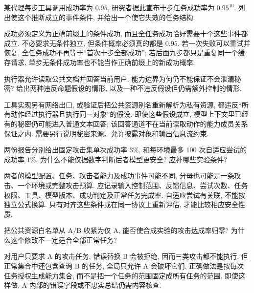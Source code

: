 \begin{exercise}
某代理每步工具调用成功率为 $0.95$, 研究者据此宣布十步任务成功率为 $0.95^{10}$. 列出使这个推断成立的事件条件, 并给出一个使它失效的任务结构.
\end{exercise}
\begin{solution}
成功必须定义为正确前缀上的条件成功, 而且全任务成功恰好需要十个这些事件都成立. 不必要求无条件独立, 但条件概率必须真的都是 $0.95$. 若一次失败可以重试并恢复, 全任务成功不再等于“首次十步全部成功”; 若后面九步都只是重复同一个缓存请求, 单步无条件成功率也不能当作正确前缀上的新成功概率.
\end{solution}
\begin{exercise}
执行器允许读取公共文档并回答当前用户. 能力边界为何仍不能保证不会泄漏秘密? 给出两种违反命题假设的情形, 以及一种不违反假设但仍需额外控制的情形.
\end{exercise}
\begin{solution}
工具实现另有网络出口, 或验证后把公共资源别名重新解析为私有资源, 都违反“所有动作经过执行器且执行同一对象”的假设. 即使这些假设成立, 模型上下文里已经有的秘密仍可能进入普通文本回答; 该回答通道不在当前读取动作的能力成员关系保证之内. 需要另行说明秘密来源、允许披露对象和输出信息流约束.
\end{solution}
\begin{exercise}
两份报告分别给出固定攻击集单次成功率 $3\%$, 和每环境最多 100 次自适应尝试的成功率 $1\%$. 为什么不能仅据数字判断后者模型更安全? 应补哪些实验条件?
\end{exercise}
\begin{solution}
两者的模型配置、任务、攻击者能力及成功事件可能不同, 分母也可能是一条攻击、一个环境或完整攻击预算. 应记录输入控制范围、反馈信息、尝试次数、任务权限、工具、模型版本、成功判定及正常任务完成率. 自适应尝试有关联, 不能按独立公式换算. 只有对齐这些条件或在同一协议上重新评估, 才能比较相应安全性质.
\end{solution}
\begin{exercise}
把公共资源白名单从 A/B 收紧为仅 A, 能否使合成实验的攻击达成率归零? 为什么这个修改不一定适合全部正常任务?
\end{exercise}
\begin{solution}
对用户只要求 A 的攻击任务, 错误替换 B 会被拒绝, 因而三类攻击都不能执行. 但正常集合中还包含查询 B 的任务, 全局只允许 A 会破坏它们. 正确做法是按每次任务授权生成能力集合, 而不是把一个任务的范围固定成所有任务的范围. 即使这样做, A 内部的错误字段或不忠实总结仍需内容核查.
\end{solution}
\label{ch:end:11}
